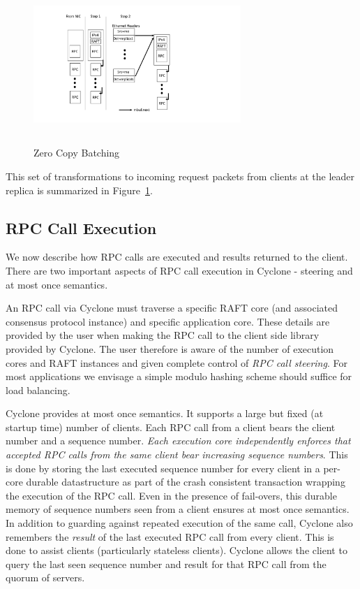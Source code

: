 \documentclass[letterpaper,twocolumn,10pt]{article}
\begin{document}
\begin{figure}
\includegraphics[width=0.7\textwidth,height=6cm]{figures/chain.pdf}
\caption{Zero Copy Batching}
\label{fig:zc_batch}
\end{figure}

This set of transformations to incoming request packets from clients at the
leader replica is summarized in Figure~\ref{fig:zc_batch}. 

\subsection{RPC Call Execution}
\label{sec:exec}
We now describe how RPC calls are executed and results returned to the
client. There are two important aspects of RPC call execution in Cyclone -
steering and at most once semantics.

An RPC call via Cyclone must traverse a specific RAFT core (and associated
consensus protocol instance) and specific application core. These details are
provided by the user when making the RPC call to the client side library
provided by Cyclone. The user therefore is aware of the number of execution
cores and RAFT instances and given complete control of \emph{RPC call steering}.
For most applications we envisage a simple modulo hashing scheme should suffice
for load balancing.

Cyclone provides at most once semantics. It supports a large but fixed (at
startup time) number of clients. Each RPC call from a client bears the client
number and a sequence number. \emph{Each execution core independently enforces
  that accepted RPC calls from the same client bear increasing sequence
  numbers}. This is done by storing the last executed sequence number for every
client in a per-core durable datastructure as part of the crash consistent
transaction wrapping the execution of the RPC call. Even in the presence of
fail-overs, this durable memory of sequence numbers seen from a client ensures
at most once semantics. In addition to guarding against repeated execution of
the same call, Cyclone also remembers the \emph{result} of the last executed RPC
call from every client. This is done to assist clients (particularly stateless
clients). Cyclone allows the client to query the last seen sequence number and
result for that RPC call from the quorum of servers.
\end{document}
